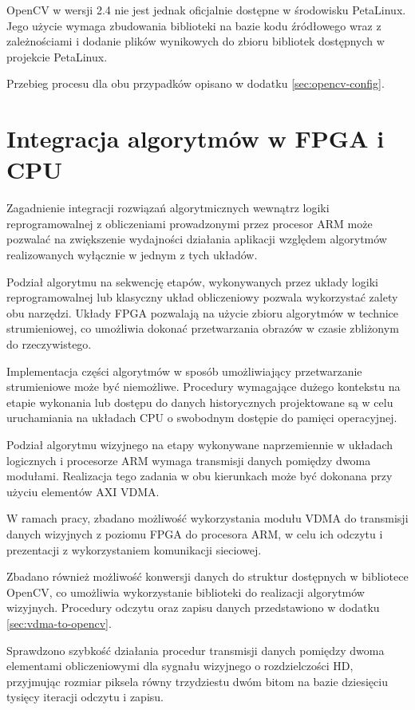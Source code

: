 OpenCV w wersji 2.4 nie jest jednak oficjalnie dostępne w środowisku PetaLinux. Jego użycie wymaga zbudowania biblioteki na bazie kodu źródłowego wraz z zależnościami i dodanie plików wynikowych do zbioru bibliotek dostępnych w projekcie PetaLinux.

Przebieg procesu dla obu przypadków opisano w dodatku \ref{sec:opencv-config}.

\section{Integracja algorytmów w FPGA i CPU}
Zagadnienie integracji rozwiązań algorytmicznych wewnątrz logiki reprogramowalnej z obliczeniami prowadzonymi przez procesor ARM może pozwalać na zwiększenie wydajności działania aplikacji względem algorytmów realizowanych wyłącznie w jednym z tych układów.

Podział algorytmu na sekwencję etapów, wykonywanych przez układy logiki reprogramowalnej lub klasyczny układ obliczeniowy pozwala wykorzystać zalety obu narzędzi. Układy FPGA pozwalają na użycie zbioru algorytmów w technice strumieniowej, co umożliwia dokonać przetwarzania obrazów w czasie zbliżonym do rzeczywistego. 

Implementacja części algorytmów w sposób umożliwiający przetwarzanie strumieniowe może być niemożliwe. Procedury wymagające dużego kontekstu na etapie wykonania lub dostępu do danych historycznych projektowane są w celu uruchamiania na układach CPU o swobodnym dostępie do pamięci operacyjnej.

Podział algorytmu wizyjnego na etapy wykonywane naprzemiennie w układach logicznych i procesorze ARM wymaga transmisji danych pomiędzy dwoma modułami. Realizacja tego zadania w obu kierunkach może być dokonana przy użyciu elementów AXI VDMA.

W ramach pracy, zbadano możliwość wykorzystania modułu VDMA do transmisji danych wizyjnych z poziomu FPGA do procesora ARM, w celu ich odczytu i prezentacji z wykorzystaniem komunikacji sieciowej.

Zbadano również możliwość konwersji danych do struktur dostępnych w bibliotece OpenCV, co umożliwia wykorzystanie biblioteki do realizacji algorytmów wizyjnych. Procedury odczytu oraz zapisu danych przedstawiono w dodatku \ref{sec:vdma-to-opencv}.

Sprawdzono szybkość działania procedur transmisji danych pomiędzy dwoma elementami obliczeniowymi dla sygnału wizyjnego o rozdzielczości HD, przyjmując rozmiar piksela równy trzydziestu dwóm bitom na bazie dziesięciu tysięcy iteracji odczytu i zapisu.

